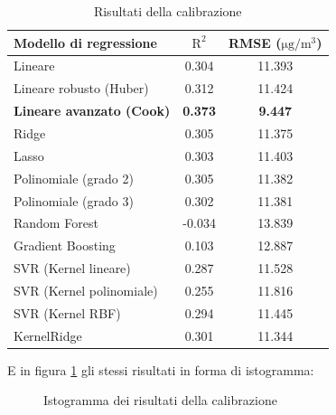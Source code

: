\begin{table}[H]
    \footnotesize
    \centering
    \def\arraystretch{0.9}
    \begin{tabular}{|l|c|c|}
    \hline
        \textbf{Modello di regressione} & $\bm{\mathrm{R^2}}$ & \textbf{RMSE (}$\mathrm{\si{\micro}g/m^3}$) \\ \hline
        Lineare & 0.304 & 11.393 \\ \hline
        Lineare robusto (Huber) & 0.312 & 11.424 \\ \hline
        \textbf{Lineare avanzato (Cook)} & \textbf{0.373} & \textbf{9.447} \\ \hline
        Ridge & 0.305 & 11.375 \\ \hline
        Lasso & 0.303 & 11.403 \\ \hline
        Polinomiale (grado 2) & 0.305 & 11.382 \\ \hline
        Polinomiale (grado 3) & 0.302 & 11.381 \\ \hline
        Random Forest & -0.034 & 13.839 \\ \hline
        Gradient Boosting & 0.103 & 12.887 \\ \hline
        SVR (Kernel lineare) & 0.287 & 11.528 \\ \hline
        SVR (Kernel polinomiale) & 0.255 & 11.816 \\ \hline
        SVR (Kernel RBF) & 0.294 & 11.445 \\ \hline
        KernelRidge & 0.301 & 11.344 \\ \hline
    \end{tabular}
    \caption{Risultati della calibrazione }
    \label{fig:risultati-no2}
\end{table}

E in figura \ref{fig:risultati-no2-hist} gli stessi risultati in forma di istogramma:

\begin{figure}[H]%
    \centering
    \captionsetup{justification=centering}
    \caption{Istogramma dei risultati della calibrazione }%
    \label{fig:risultati-no2-hist}%
\end{figure}

